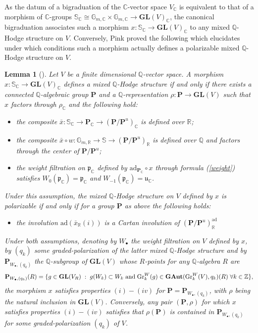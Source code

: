 \documentclass[10pt]{article}
\numberwithin{equation}{subsection}
\theoremstyle{plain}
\newtheorem{lemma}[theorem]{Lemma}
\theoremstyle{definition}
\theoremstyle{remark}
\newcommand{\Z}{\mathbb Z}
\newcommand{\Q}{\mathbb Q}
\newcommand{\C}{\mathbb C}
\newcommand{\R}{\mathbb R}
\newcommand{\s}{\mathbb S}
\newcommand{\mult}{\mathbb G}
\newcommand{\pp}{\mathbf P}
\newcommand{\bul}{\bullet}
\newcommand{\gr}{\mathrm{Gr}}
\newcommand{\gl}{\mathbf{GL}}
\newcommand{\para}{\mathfrak{p}}
\newcommand{\lieu}{\mathfrak{u}}
\newcommand{\ad}{\mathrm{ad}}
\newcommand{\ppol}{\pp_{W_\bul, (q_k)}}
\begin{document}
As the datum of a bigraduation of the $\C$-vector space $V_\C$  is equivalent to that of a morphism of $\C$-groups $\s_\C \cong \mult_{m,\C} \times \mult_{m,\C} \rightarrow \gl(V)_\C$, the canonical bigraduation associates such a morphism $x : \s_\C \rightarrow \gl(V)_\C$ to any mixed $\Q$-Hodge structure on $V$. Conversely, Pink proved the following which elucidates under which conditions such a morphism actually defines a polarizable mixed $\Q$-Hodge structure on $V$.
\begin{lemma}[{\cite[(1.4) and (1.5)]{pinkthese}}]\label{pinkcarac}
Let $V$ be a finite dimensional $\Q$-vector space. A morphism $x : \s_\C \rightarrow \gl(V)_\C$ defines a mixed $\Q$-Hodge structure if and only if there exists a connected $\Q$-algebraic group $\pp$ and a $\Q$-representation $\rho : \pp \rightarrow \gl(V)$ such that $x$ factors through $\rho_\C$ and the following hold:
\begin{itemize}
\item[(i)] the composite $\bar{x} : \s_\C \rightarrow \pp_\C \rightarrow (\pp/\pp^u)_\C$ is defined over $\R$;
\item[(ii)]the composite $\bar{x} \circ w : \mult_{m,\R} \rightarrow \s \rightarrow (\pp/\pp^u)_\R$ is defined over $\Q$ and factors through the center of $\pp/\pp^u$;
\item[(iii)] the weight filtration on $\para_\C$ defined by $\ad_{\pp_\C} \circ x$ through formula (\ref{weight}) satisfies $W_0(\para_\C) = \para_\C$ and $W_{-1}(\para_\C) = \lieu_\C$.
\end{itemize}
Under this assumption, the mixed $\Q$-Hodge structure on $V$ defined by $x$ is polarizable if and only if for a group $\pp$ as above the following holds:
\begin{itemize}
\item[(iv)] the involution $\ad (\bar{x}_\R(i))$ is a Cartan involution of $(\pp/\pp^u)_\R^\ad$
\end{itemize}
Under both assumptions, denoting by $W_\bul$ the weight filtration on $V$ defined by $x$, by $(q_k)$ some graded-polarization of the latter mixed $\Q$-Hodge structure and by $\ppol$ the $\Q$-subgroup of $\gl(V)$ whose $R$-points for any $\Q$-algebra $R$ are
{\small\[
\ppol(R) = \{ g \in \gl(V_R) \hspace{0.1cm} : \hspace{0.1cm} g(W_k) \subset W_k \hspace{0.1cm} \mathrm{and} \hspace{0.1cm} \gr_k^W(g) \in \mathbf{GAut}(\gr_k^W(V), q_k)(R) \hspace{0.1cm} \forall k \in \Z\},
\]}
the morphism $x$ satisfies properties $(i)-(iv)$ for $\pp = \ppol$, with $\rho$ being the natural inclusion in $\gl(V)$. Conversely, any pair $(\pp, \rho)$ for which $x$ satisfies properties $(i)-(iv)$ satisfies that $\rho(\pp)$ is contained in $\ppol$ for some graded-polarization $(q_k)$ of $V$.
\end{lemma}
\end{document}
